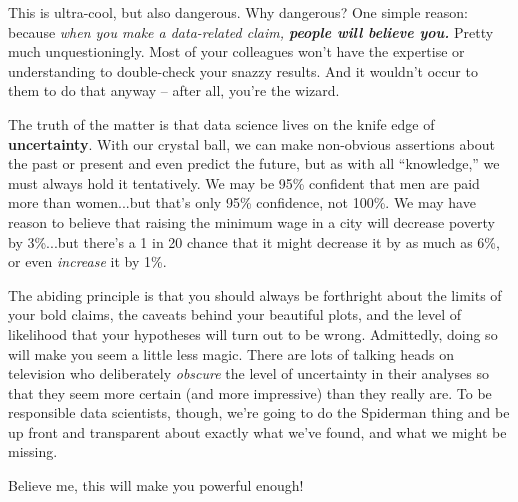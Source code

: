 This is ultra-cool, but also dangerous. Why dangerous? One simple reason:
because \textit{when you make a data-related claim, \textbf{people will believe
you.}} Pretty much unquestioningly. Most of your colleagues won't have the
expertise or understanding to double-check your snazzy results. And it wouldn't
occur to them to do that anyway -- after all, you're the wizard.


The truth of the matter is that data science lives on the knife edge of
\textbf{uncertainty}. With our crystal ball, we can make non-obvious assertions
about the past or present and even predict the future, but as with all
``knowledge,'' we must always hold it tentatively. We may be 95\% confident
that men are paid more than women...but that's only 95\% confidence, not 100\%.
We may have reason to believe that raising the minimum wage in a city will
decrease poverty by 3\%...but there's a 1 in 20 chance that it might decrease
it by as much as 6\%, or even \textit{increase} it by 1\%.

The abiding principle is that you should always be forthright about the limits
of your bold claims, the caveats behind your beautiful plots, and the level of
likelihood that your hypotheses will turn out to be wrong. Admittedly, doing so
will make you seem a little less magic. There are lots of talking heads on
television who deliberately \textit{obscure} the level of uncertainty in their
analyses so that they seem more certain (and more impressive) than they really
are. To be responsible data scientists, though, we're going to do the Spiderman
thing and be up front and transparent about exactly what we've found, and what
we might be missing.

Believe me, this will make you powerful enough!

